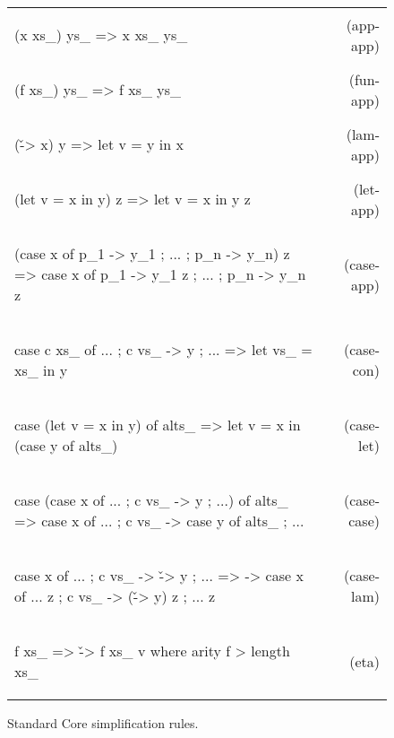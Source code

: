 \documentclass{sigplanconf}
\newcommand{\simp}[2]{\begin{minipage}{6.4cm}#2\end{minipage} & (#1) \\}
\newenvironment{simplify}
    {\noindent
     \begin{flushright}
     \begin{tabular}{p{6.5cm}r}
    }
    {\end{tabular}
     \end{flushright}
    }
\begin{document}
\begin{figure}
\begin{simplify}

\simp{app-app}{
\ignore\begin{code}
(x xs_) ys_
    => x xs_ ys_
\end{code}}

\simp{fun-app}{
\ignore\begin{code}
(f xs_) ys_
    => f xs_ ys_
\end{code}}

\simp{lam-app}{
\ignore\begin{code}
(\v -> x) y
    => let v = y in x
\end{code}}

\simp{let-app}{
\ignore\begin{code}
(let v = x in y) z
    => let v = x in y z
\end{code}}

\simp{case-app}{
\ignore\begin{code}
(case x of {p_1 -> y_1 ; ... ; p_n -> y_n}) z
    => case x of {p_1 -> y_1 z ; ... ; p_n -> y_n z}
\end{code}}

\simp{case-con}{
\ignore\begin{code}
case c xs_ of {... ; c vs_ -> y ; ...}
    => let vs_ = xs_ in y
\end{code}}

\simp{case-let}{
\ignore\begin{code}
case (let v = x in y) of alts_
    => let v = x in (case y of alts_)
\end{code}}

\simp{case-case}{
\ignore\begin{code}
case (case x of {... ; c vs_ -> y ; ...}) of alts_
    => case x of {... ; c vs_ -> case y of alts_ ; ...}
\end{code}}

\simp{case-lam}{
\ignore\begin{code}
case x of {... ; c vs_ -> \v -> y ; ...}
    => \z -> case  x of
                   {... z ; c vs_ -> (\v -> y) z ; ... z}
\end{code}}

\simp{eta}{
\ignore\begin{code}
f xs_
    => \v -> f xs_ v
    where arity f > length xs_
\end{code}}

\end{simplify}
\caption{Standard Core simplification rules.}
\label{fig:simplify}
\end{figure}
\end{document}
